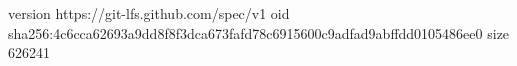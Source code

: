 version https://git-lfs.github.com/spec/v1
oid sha256:4c6cca62693a9dd8f8f3dca673fafd78c6915600c9adfad9abffdd0105486ee0
size 626241

